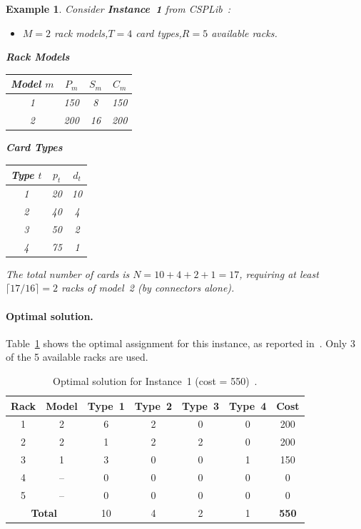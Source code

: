 \documentclass[11pt,a4paper]{article}
\newtheorem{example}{Example}
\begin{document}
\begin{example}
Consider \textbf{Instance~1} from CSPLib~\cite{csplib}:
\begin{itemize}
  \item $M = 2$ rack models,\quad $T = 4$ card types,\quad $R = 5$ available racks.
\end{itemize}

\medskip
\begin{minipage}[t]{0.45\textwidth}
\centering
\textbf{Rack Models}\\[4pt]
\begin{tabular}{cccc}
\toprule
Model $m$ & $P_m$ & $S_m$ & $C_m$ \\
\midrule
1 & 150 & 8  & 150 \\
2 & 200 & 16 & 200 \\
\bottomrule
\end{tabular}
\end{minipage}
\hfill
\begin{minipage}[t]{0.45\textwidth}
\centering
\textbf{Card Types}\\[4pt]
\begin{tabular}{ccc}
\toprule
Type $t$ & $p_t$ & $d_t$ \\
\midrule
1 & 20 & 10 \\
2 & 40 &  4 \\
3 & 50 &  2 \\
4 & 75 &  1 \\
\bottomrule
\end{tabular}
\end{minipage}

\medskip\noindent
The total number of cards is $N = 10 + 4 + 2 + 1 = 17$,
requiring at least $\lceil 17/16 \rceil = 2$ racks of model~2
(by connectors alone).
\end{example}

\paragraph{Optimal solution.}
Table~\ref{tab:solution1} shows the optimal assignment for this
instance, as reported in~\cite{Kiziltan01symmetrybreaking}.
Only 3 of the 5 available racks are used.

\begin{table}[ht]
\centering
\caption{Optimal solution for Instance~1
  (cost = 550)~\cite{Kiziltan01symmetrybreaking}.}
\label{tab:solution1}
\begin{tabular}{cc*{4}{c}c}
\toprule
Rack & Model & Type~1 & Type~2 & Type~3 & Type~4 & Cost \\
\midrule
1 & 2 & 6 & 2 & 0 & 0 & 200 \\
2 & 2 & 1 & 2 & 2 & 0 & 200 \\
3 & 1 & 3 & 0 & 0 & 1 & 150 \\
4 & -- & 0 & 0 & 0 & 0 & 0 \\
5 & -- & 0 & 0 & 0 & 0 & 0 \\
\midrule
\multicolumn{2}{c}{\textbf{Total}} & 10 & 4 & 2 & 1 & \textbf{550} \\
\bottomrule
\end{tabular}
\end{table}
\end{document}
